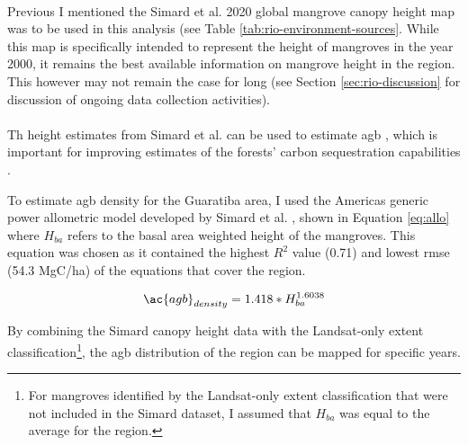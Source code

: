 \paragraph{} \label{sec:rio-mangrove-height} \leavevmode\newline

Previous I mentioned the Simard et al. 2020 global mangrove canopy height map was to be used in this analysis (see Table \ref{tab:rio-environment-sources}. While this map is specifically intended to represent the height of mangroves in the year 2000, it remains the best available information on mangrove height in the region. This however may not remain the case for long (see Section \ref{sec:rio-discussion} for discussion of ongoing data collection activities).

\paragraph{} \label{sec:rio-mangrove-carbon} \leavevmode\newline

Th height estimates from Simard et al. can be used to estimate \ac{agb} \cite{cloughAllometricRelationshipsEstimating1989, fatoyinboEstimatingMangroveAboveground2018, simardMangroveCanopyHeight2019}, which is important for improving estimates of the forests' carbon sequestration capabilities \cite{lagomasinoMeasuringMangroveCarbon2019}. 

To estimate \ac{agb} density for the Guaratiba area, I used the Americas generic power allometric model developed by Simard et al. \cite{simardMangroveCanopyHeight2019}, shown in Equation \ref{eq:allo} where $H_{ba}$ refers to the basal area weighted height of the mangroves. This equation was chosen as it contained the highest $R^2$ value (0.71) and lowest \ac{rmse} (54.3 MgC/ha) of the equations that cover the region. 

\begin{equation}
\label{eq:allo}
\ac{agb}_{density} = 1.418 * H_{ba}^{1.6038}
\end{equation}

By combining the Simard canopy height data with the Landsat-only extent classification\footnote{For mangroves identified by the Landsat-only extent classification that were not included in the Simard dataset, I assumed that $H_{ba}$ was equal to the average for the region.}, the \ac{agb} distribution of the region can be mapped for specific years.

